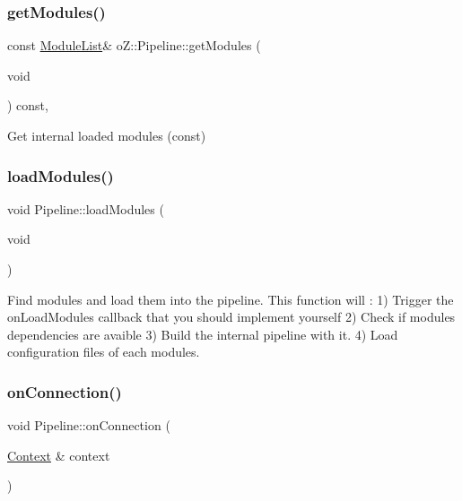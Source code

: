 \subsubsection{\texorpdfstring{getModules()}{getModules()}\hspace{0.1cm}{\footnotesize\ttfamily [2/2]}}
{\footnotesize\ttfamily const \mbox{\hyperlink{classo_z_1_1_pipeline_a3bb478d291a83763b269d8d27e186a47}{Module\+List}}\& o\+Z\+::\+Pipeline\+::get\+Modules (\begin{DoxyParamCaption}\item[{void}]{ }\end{DoxyParamCaption}) const\hspace{0.3cm}{\ttfamily [inline]}, {\ttfamily [noexcept]}}



Get internal loaded modules (const) 

\mbox{\label{classo_z_1_1_pipeline_a2815743412c13100c68fee0d87283417}} 
\subsubsection{\texorpdfstring{loadModules()}{loadModules()}}
{\footnotesize\ttfamily void Pipeline\+::load\+Modules (\begin{DoxyParamCaption}\item[{void}]{ }\end{DoxyParamCaption})}



Find modules and load them into the pipeline. This function will \+: 1) Trigger the on\+Load\+Modules callback that you should implement yourself 2) Check if modules dependencies are avaible 3) Build the internal pipeline with it. 4) Load configuration files of each modules. 

\mbox{\label{classo_z_1_1_pipeline_ab8665c339158428e7e8851bbb0b000ad}} 
\subsubsection{\texorpdfstring{onConnection()}{onConnection()}}
{\footnotesize\ttfamily void Pipeline\+::on\+Connection (\begin{DoxyParamCaption}\item[{\mbox{\hyperlink{classo_z_1_1_context}{Context}} \&}]{context }\end{DoxyParamCaption})\hspace{0.3cm}{\ttfamily [virtual]}}



